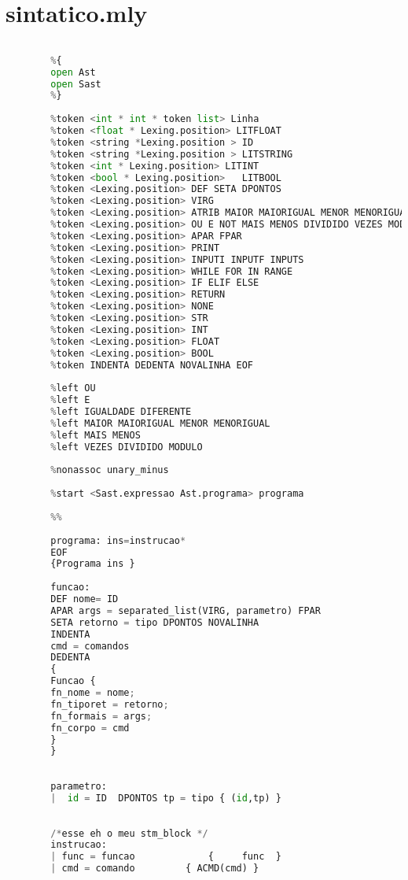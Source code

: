 \documentclass[hidelinks,12pt]{article}
\begin{document}
\begin{appendices}
\begin{lstlisting}[caption=interprete.mll, language=python]
	
	

	\end{lstlisting}
	
	\newpage
	\chapter{sintatico.mly}
	
	\begin{lstlisting}[caption=sintatico.mly, language=python]
	
		%{
		open Ast
		open Sast
		%}
		
		%token <int * int * token list> Linha 
		%token <float * Lexing.position> LITFLOAT
		%token <string *Lexing.position > ID
		%token <string *Lexing.position > LITSTRING
		%token <int * Lexing.position> LITINT
		%token <bool * Lexing.position>   LITBOOL
		%token <Lexing.position> DEF SETA DPONTOS 
		%token <Lexing.position> VIRG
		%token <Lexing.position> ATRIB MAIOR MAIORIGUAL MENOR MENORIGUAL DIFERENTE IGUALDADE
		%token <Lexing.position> OU E NOT MAIS MENOS DIVIDIDO VEZES MODULO
		%token <Lexing.position> APAR FPAR
		%token <Lexing.position> PRINT
		%token <Lexing.position> INPUTI INPUTF INPUTS
		%token <Lexing.position> WHILE FOR IN RANGE
		%token <Lexing.position> IF ELIF ELSE 
		%token <Lexing.position> RETURN
		%token <Lexing.position> NONE
		%token <Lexing.position> STR
		%token <Lexing.position> INT
		%token <Lexing.position> FLOAT
		%token <Lexing.position> BOOL
		%token INDENTA DEDENTA NOVALINHA EOF
		
		%left OU 
		%left E
		%left IGUALDADE DIFERENTE
		%left MAIOR MAIORIGUAL MENOR MENORIGUAL
		%left MAIS MENOS
		%left VEZES DIVIDIDO MODULO
		
		%nonassoc unary_minus
		
		%start <Sast.expressao Ast.programa> programa
		
		%%
		
		programa: ins=instrucao*  
		EOF 
		{Programa ins }
		
		funcao:
		DEF nome= ID
		APAR args = separated_list(VIRG, parametro) FPAR
		SETA retorno = tipo DPONTOS NOVALINHA 
		INDENTA
		cmd = comandos 
		DEDENTA 
		{
		Funcao {
		fn_nome = nome;
		fn_tiporet = retorno;
		fn_formais = args;
		fn_corpo = cmd
		}
		} 
		
		
		parametro:
		|  id = ID  DPONTOS tp = tipo { (id,tp) }
		
		
		/*esse eh o meu stm_block */
		instrucao:	
		| func = funcao  		  	{     func 	}
		| cmd = comando 		{ ACMD(cmd) }
		

\end{lstlisting}
\end{appendices}
\end{document}

